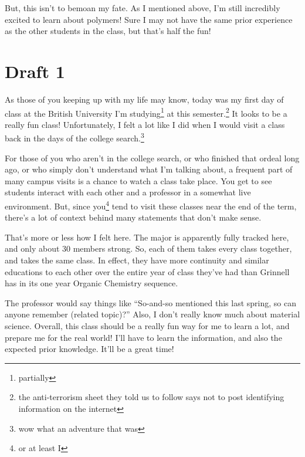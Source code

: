 \documentclass[12pt]{article}[titlepage]
\newcommand{\say}[1]{``#1''}
\newcommand{\1}{\={a}}
\newcommand{\2}{\={e}}
\newcommand{\3}{\={\i}}
\newcommand{\4}{\=o}
\newcommand{\5}{\=u}
\newcommand{\6}{\={A}}
\renewcommand{\,}{\textsuperscript{,}}
\begin{document}
But, this isn't to bemoan my fate.
As I mentioned above, I'm still incredibly excited to learn about polymers!
Sure I may not have the same prior experience as the other students in the class, but that's half the fun!

\section{Draft 1}
As those of you keeping up with my life may know, today was my first day of class at the British University I'm studying\footnote{partially} at this semester.\footnote{the anti-terrorism sheet they told us to follow says not to post identifying information on the internet}
It looks to be a really fun class!
Unfortunately, I felt a lot like I did when I would visit a class back in the days of the college search.\footnote{wow what an adventure that was}

For those of you who aren't in the college search, or who finished that ordeal long ago, or who simply don't understand what I'm talking about, a frequent part of many campus visits is a chance to watch a class take place.
You get to see students interact with each other and a professor in a somewhat live environment.
But, since you\footnote{or at least I} tend to visit these classes near the end of the term, there's a lot of context behind many statements that don't make sense.

That's more or less how I felt here.
The major is apparently fully tracked here, and only about 30 members strong.
So, each of them takes every class together, and takes the same class.
In effect, they have more continuity and similar educations to each other over the entire year of class they've had than Grinnell has in its one year Organic Chemistry sequence.

The professor would say things like \say{So-and-so mentioned this last spring, so can anyone remember (related topic)?}
Also, I don't really know much about material science.
Overall, this class should be a really fun way for me to learn a lot, and prepare me for the real world!
I'll have to learn the information, and also the expected prior knowledge.
It'll be a great time!
\end{document}
